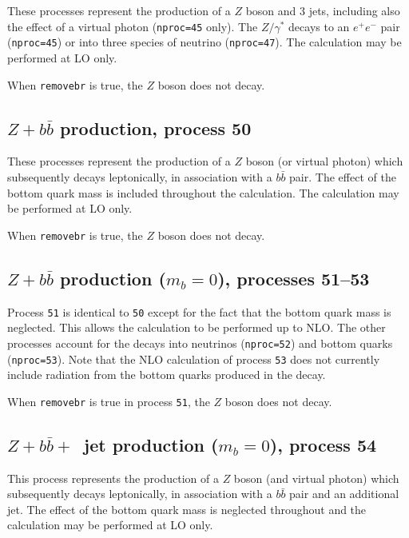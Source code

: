 \documentclass{article}
\begin{document}
These processes represent the production of a $Z$ boson and $3$ jets,
including also the effect of a virtual photon ({\tt nproc=45} only). The $Z/\gamma^*$ decays
to an $e^+ e^-$ pair ({\tt nproc=45}) or into three species of neutrino ({\tt nproc=47}).
The calculation may be performed at LO only.

When {\tt removebr} is true, the $Z$ boson does not decay.

\subsection{$Z+b{\bar b}$ production, process 50}
\label{subsec:zbb}

These processes represent the production of a $Z$ boson (or virtual photon)
which subsequently decays leptonically, in association
with a $b{\bar b}$ pair. The effect of
the bottom quark mass is included throughout the calculation.  
The calculation may be performed at LO only.

When {\tt removebr} is true, the $Z$ boson does not decay.

\subsection{$Z+b{\bar b}$ production ($m_b=0$), processes 51--53}
\label{subsec:zbbmassless}

Process {\tt 51} is identical to {\tt 50} except for the fact
that the bottom quark mass is neglected. This allows the calculation to be
performed up to NLO. The other processes account for the decays into
neutrinos ({\tt nproc=52}) and bottom quarks ({\tt nproc=53}). Note that
the NLO calculation of process {\tt 53} does not currently 
include radiation from the
bottom quarks produced in the decay.

When {\tt removebr} is true in process {\tt 51}, the $Z$ boson does not decay.

\subsection{$Z+b{\bar b}+$~jet production ($m_b=0$), process 54}
\label{subsec:zbbjetmassless}

This process represents the production of a $Z$ boson (and virtual photon)
which subsequently decays leptonically, in association
with a $b{\bar b}$ pair and an additional jet.
The effect of the bottom quark mass is neglected throughout
and the calculation may be performed at LO only.
\end{document}
